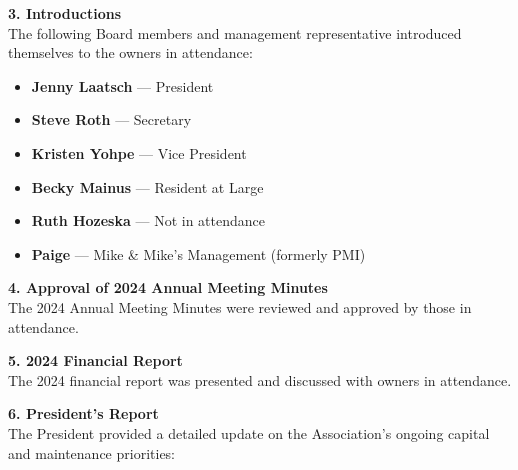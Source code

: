 \documentclass[11pt]{article}
\newcommand{\strong}[1]{\textbf{#1}}
\begin{document}
\vspace{0.75em}

\noindent
\strong{3. Introductions}\\[0.5em]
The following Board members and management representative introduced themselves to the
owners in attendance:

\begin{itemize}[leftmargin=1.1em]
    \item \strong{Jenny Laatsch} --- President
    \item \strong{Steve Roth} --- Secretary
    \item \strong{Kristen Yohpe} --- Vice President
    \item \strong{Becky Mainus} --- Resident at Large
    \item \strong{Ruth Hozeska} --- Not in attendance
    \item \strong{Paige} --- Mike \& Mike's Management (formerly PMI)
\end{itemize}

\vspace{0.75em}

\noindent
\strong{4. Approval of 2024 Annual Meeting Minutes}\\[0.5em]
The 2024 Annual Meeting Minutes were reviewed and approved by those in attendance.

\vspace{0.75em}

\noindent
\strong{5. 2024 Financial Report}\\[0.5em]
The 2024 financial report was presented and discussed with owners in attendance.

\vspace{0.75em}

\noindent
\strong{6. President's Report}\\[0.5em]
The President provided a detailed update on the Association's ongoing capital and maintenance
priorities:
\end{document}
